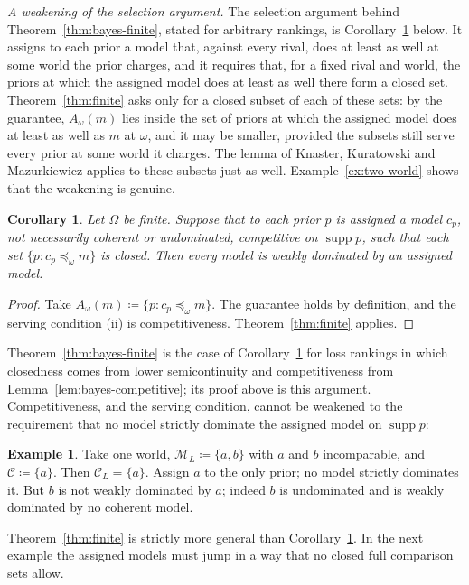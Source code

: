 \documentclass[11pt]{article}
\newtheorem{corollary}[theorem]{Corollary}
\theoremstyle{definition}
\newtheorem{example}[theorem]{Example}
\theoremstyle{remark}
\newcommand{\M}{\mathcal M}
\newcommand{\C}{\mathcal C}
\newcommand{\supp}{\operatorname{supp}}
\begin{document}
\emph{A weakening of the selection argument.} The selection argument behind Theorem~\ref{thm:bayes-finite}, stated for arbitrary rankings, is Corollary~\ref{cor:closed-choice} below. It assigns to each prior a model that, against every rival, does at least as well at some world the prior charges, and it requires that, for a fixed rival and world, the priors at which the assigned model does at least as well there form a closed set. Theorem~\ref{thm:finite} asks only for a closed subset of each of these sets: by the guarantee, $A_\omega(m)$ lies inside the set of priors at which the assigned model does at least as well as $m$ at $\omega$, and it may be smaller, provided the subsets still serve every prior at some world it charges. The lemma of Knaster, Kuratowski and Mazurkiewicz applies to these subsets just as well. Example~\ref{ex:two-world} shows that the weakening is genuine.

\begin{corollary}\label{cor:closed-choice}
Let $\Omega$ be finite. Suppose that to each prior $p$ is assigned a model $c_p$, not necessarily coherent or undominated, competitive on $\supp p$, such that each set $\{p:c_p\preceq_\omega m\}$ is closed. Then every model is weakly dominated by an assigned model.
\end{corollary}
\begin{proof}
Take $A_\omega(m)\coloneqq\{p:c_p\preceq_\omega m\}$. The guarantee holds by definition, and the serving condition (ii) is competitiveness. Theorem~\ref{thm:finite} applies.
\end{proof}

Theorem~\ref{thm:bayes-finite} is the case of Corollary~\ref{cor:closed-choice} for loss rankings in which closedness comes from lower semicontinuity and competitiveness from Lemma~\ref{lem:bayes-competitive}; its proof above is this argument. Competitiveness, and the serving condition, cannot be weakened to the requirement that no model strictly dominate the assigned model on $\supp p$:

\begin{example}\label{ex:incomparable}
Take one world, $\M_L\coloneqq\{a,b\}$ with $a$ and $b$ incomparable, and $\C\coloneqq\{a\}$. Then $\C_L=\{a\}$. Assign $a$ to the only prior; no model strictly dominates it. But $b$ is not weakly dominated by $a$; indeed $b$ is undominated and is weakly dominated by no coherent model.
\end{example}

Theorem~\ref{thm:finite} is strictly more general than Corollary~\ref{cor:closed-choice}. In the next example the assigned models must jump in a way that no closed full comparison sets allow.
\end{document}
